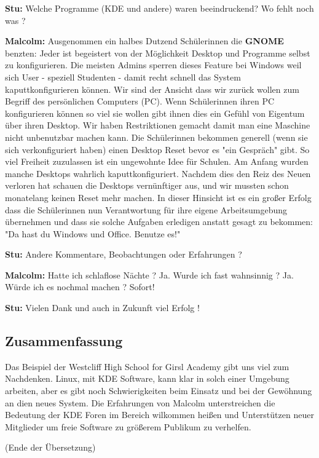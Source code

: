 \textbf{Stu:} Welche Programme (KDE und andere) waren beeindruckend? Wo fehlt noch was ?

\textbf{Malcolm:} Ausgenommen ein halbes Dutzend Schülerinnen die \textbf{GNOME} benzten: Jeder ist begeistert von der Möglichkeit Desktop und Programme selbst zu konfigurieren. Die meisten Admins sperren dieses Feature bei Windows weil sich User - speziell Studenten - damit recht schnell das System kaputtkonfigurieren können. Wir sind der Ansicht dass wir zurück wollen zum Begriff des persönlichen Computers (PC). Wenn Schülerinnen ihren PC konfigurieren können so viel sie wollen gibt ihnen dies ein Gefühl von Eigentum über ihren Desktop. Wir haben Restriktionen gemacht damit man eine Maschine nicht unbenutzbar machen kann. Die Schülerinnen bekommen generell (wenn sie sich verkonfiguriert haben) einen Desktop Reset bevor es "ein Gespräch" gibt. So viel Freiheit zuzulassen ist ein ungewohnte Idee für Schulen. Am Anfang wurden manche Desktops wahrlich kaputtkonfiguriert. Nachdem dies den Reiz des Neuen verloren hat schauen die Desktops vernünftiger aus, und wir mussten schon monatelang keinen Reset mehr machen. In dieser Hinsicht ist es ein großer Erfolg dass die Schülerinnen nun Verantwortung für ihre eigene Arbeitsumgebung übernehmen und dass sie solche Aufgaben erledigen anstatt gesagt zu bekommen: "Da hast du Windows und Office. Benutze es!"

\textbf{Stu:} Andere Kommentare, Beobachtungen oder Erfahrungen ? 

\textbf{Malcolm:} Hatte ich schlaflose Nächte ? Ja. Wurde ich fast wahnsinnig ? Ja. Würde ich es nochmal machen ? Sofort! 

\textbf{Stu:} Vielen Dank und auch in Zukunft viel Erfolg !



\subsection*{Zusammenfassung}

Das Beispiel der Westcliff High School for Girsl Academy gibt uns viel zum Nachdenken. Linux, mit KDE Software, kann klar in solch einer Umgebung arbeiten, aber es gibt noch Schwierigkeiten beim Einsatz und bei der Gewöhnung an dien neues System. Die Erfahrungen von Malcolm unterstreichen die Bedeutung der KDE Foren im Bereich wilkommen heißen und Unterstützen neuer Mitglieder um freie Software zu größerem Publikum zu verhelfen.

(Ende der Übersetzung)

